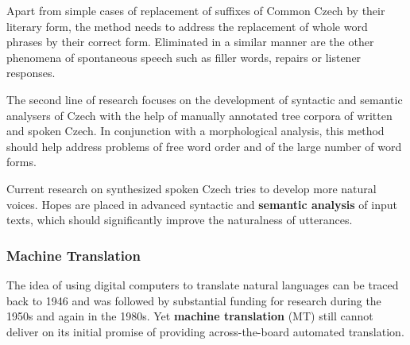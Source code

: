 \begin{multicols}{2}
Apart from simple cases of replacement of suffixes of Common Czech by their literary form, the method needs to address the replacement of whole word phrases by their correct form. Eliminated in a similar manner are the other phenomena of spontaneous speech such as filler words, repairs or listener responses.
\columnbreak

The second line of research focuses on the development of syntactic and semantic analysers of Czech with the help of manually annotated tree corpora of written and spoken Czech. In conjunction with a morphological analysis, this method should help address problems of free word order and of the large number of word forms.

Current research on synthesized spoken Czech tries to develop more natural voices. Hopes are placed in advanced syntactic and \textbf{semantic analysis} of input texts, which should significantly improve the naturalness of utterances.

\subsubsection{Machine Translation}

The idea of using digital computers to translate natural languages can be traced back to 1946 and was followed by substantial funding for research during the 1950s and again in the 1980s. Yet \textbf{machine translation} (MT) still cannot deliver on its initial promise of providing across-the-board automated translation.



\end{multicols}
